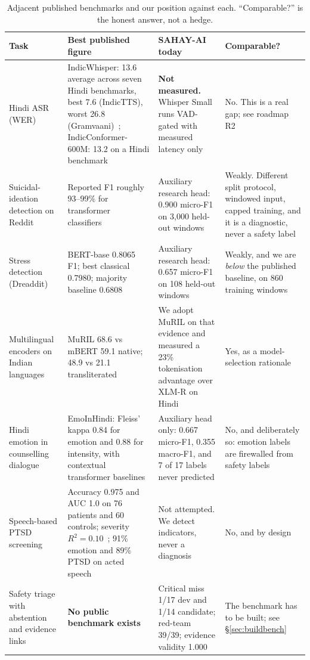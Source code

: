 \documentclass[11pt,a4paper]{article}
\begin{document}
\begin{table}[!htbp]
\centering\footnotesize
\caption{Adjacent published benchmarks and our position against each. ``Comparable?'' is the honest
answer, not a hedge.}
\label{tab:benchtable}
\begin{tabularx}{\linewidth}{@{}>{\raggedright\arraybackslash}p{3.1cm}>{\raggedright\arraybackslash}p{4.3cm}>{\raggedright\arraybackslash}p{3.5cm}X@{}}
\toprule
Task & Best published figure & SAHAY-AI today & Comparable? \\
\midrule
Hindi ASR (WER) & IndicWhisper: 13.6 average across seven Hindi benchmarks, best 7.6 (IndicTTS),
worst 26.8 (Gramvaani)~\cite{vistaar}; IndicConformer-600M: 13.2 on a Hindi
benchmark~\cite{indicconformer} & \textbf{Not measured.} Whisper Small runs VAD-gated with measured
latency only & No. This is a real gap; see roadmap R2 \\
Suicidal-ideation detection on Reddit & Reported F1 roughly 93--99\% for transformer
classifiers~\cite{suicidereview,suiciderobertas} & Auxiliary research head: 0.900 micro-F1 on 3{,}000
held-out windows & Weakly. Different split protocol, windowed input, capped training, and it is a
diagnostic, never a safety label \\
Stress detection (Dreaddit) & BERT-base 0.8065 F1; best classical 0.7980; majority baseline
0.6808~\cite{dreaddit} & Auxiliary research head: 0.657 micro-F1 on 108 held-out windows & Weakly,
and we are \emph{below} the published baseline, on 860 training windows \\
Multilingual encoders on Indian languages & MuRIL 68.6 vs mBERT 59.1 native; 48.9 vs 21.1
transliterated~\cite{khanuja2021} & We adopt MuRIL on that evidence and measured a 23\% tokenisation
advantage over XLM-R on Hindi & Yes, as a model-selection rationale \\
Hindi emotion in counselling dialogue & EmoInHindi: Fleiss' kappa 0.84 for emotion and 0.88 for
intensity, with contextual transformer baselines~\cite{singh2022} & Auxiliary head only: 0.667
micro-F1, 0.355 macro-F1, and 7 of 17 labels never predicted & No, and deliberately so: emotion
labels are firewalled from safety labels \\
Speech-based PTSD screening & Accuracy 0.975 and AUC 1.0 on 76 patients and 60 controls; severity
$R^2 = 0.10$~\cite{hu2024}; 91\% emotion and 89\% PTSD on acted speech~\cite{islam2024} & Not
attempted. We detect indicators, never a diagnosis & No, and by design \\
Safety triage with abstention and evidence links & \textbf{No public benchmark exists} & Critical
miss 1/17 dev and 1/14 candidate; red-team 39/39; evidence validity 1.000 & The benchmark has to be
built; see \S\ref{sec:buildbench} \\
\bottomrule
\end{tabularx}
\end{table}
\end{document}
